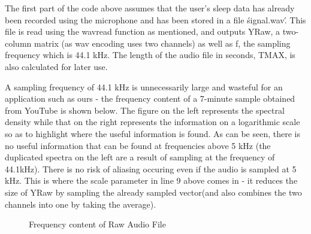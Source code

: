 The first part of the code above assumes that the user's sleep data has already been recorded using the microphone and has been stored in a file \'signal.wav\'. This file is read using the wavread function as mentioned, and outputs YRaw, a two-column matrix (as wav encoding uses two channels) as well as f, the sampling frequency which is 44.1 kHz. The length of the audio file in seconds, TMAX, is also calculated for later use.

A sampling frequency of 44.1 kHz is unnecessarily large and wasteful for an application such as ours - the frequency content of a 7-minute sample obtained from YouTube \cite{simplevideo} is shown below. The figure on the left represents the spectral density while that on the right represents the information on a logarithmic scale so as to highlight where the useful information is found. As can be seen, there is no useful information that can be found at frequencies above 5 kHz (the duplicated spectra on the left are a result of sampling at the frequency of 44.1kHz). There is no risk of aliasing occuring even if the audio is sampled at 5 kHz. This is where the scale parameter in line 9 above comes in - it reduces the size of YRaw by sampling the already sampled vector(and also combines the two channels into one by taking the average). 

\begin{figure}[!htb]
		\centering
		\caption{Frequency content of Raw Audio File}
		\label{fig:simpleRawFreqContent}
	\end{figure}

